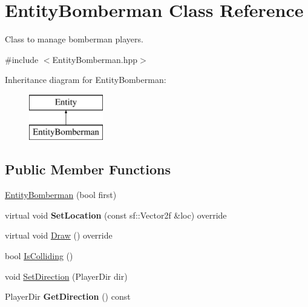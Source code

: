 \hypertarget{class_entity_bomberman}{}\section{Entity\+Bomberman Class Reference}
\label{class_entity_bomberman}


Class to manage bomberman players.  




{\ttfamily \#include $<$Entity\+Bomberman.\+hpp$>$}

Inheritance diagram for Entity\+Bomberman\+:\begin{figure}[H]
\begin{center}
\leavevmode
\includegraphics[height=2.000000cm]{class_entity_bomberman}
\end{center}
\end{figure}
\subsection*{Public Member Functions}
\begin{DoxyCompactItemize}
\item 
\mbox{\hyperlink{class_entity_bomberman_aecfbe83ba3dccae03069ed5e199337b2}{Entity\+Bomberman}} (bool first)
\item 
\mbox{\label{class_entity_bomberman_a48c96abf879366491e9b2bf1368625a4}} 
virtual void {\bfseries Set\+Location} (const sf\+::\+Vector2f \&loc) override
\item 
virtual void \mbox{\hyperlink{class_entity_bomberman_a8cc4d0ad8f449ec8f15a1c11ea4b643e}{Draw}} () override
\item 
bool \mbox{\hyperlink{class_entity_bomberman_a34a0f17c5aab2afcf56a7ea84190193f}{Is\+Colliding}} ()
\item 
void \mbox{\hyperlink{class_entity_bomberman_ad9997de80c14794d3b442e7e6d773893}{Set\+Direction}} (Player\+Dir dir)
\item 
\mbox{\label{class_entity_bomberman_a44ddaa5a895be24435e9becb74df9d90}} 
Player\+Dir {\bfseries Get\+Direction} () const
\end{DoxyCompactItemize}
